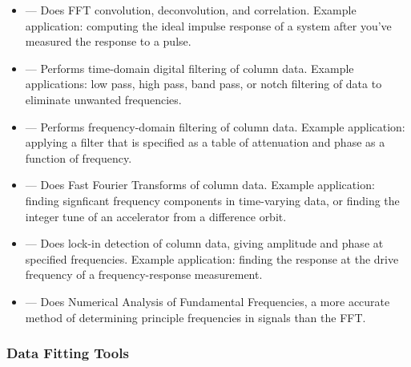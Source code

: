 \documentclass[11pt]{article}
\begin{document}
\begin{itemize}

\item {} --- Does FFT convolution, deconvolution, and correlation. Example
application: computing the ideal impulse response of a system after you've measured the response to
a pulse.

\item {} --- Performs time-domain digital filtering of column data.  Example applications:
low pass, high pass, band pass, or notch filtering of data to eliminate unwanted frequencies.

\item {} --- Performs frequency-domain filtering of column data.  Example application:
applying a filter that is specified as a table of attenuation and phase as a function of frequency.

\item {} --- Does Fast Fourier Transforms of column data.  Example application: finding signficant
frequency components in time-varying data, or finding the integer tune of an accelerator from a difference orbit.

\item {} --- Does lock-in detection of column data, giving amplitude and phase at specified
frequencies.  Example application: finding the response at the drive frequency of a frequency-response measurement.

\item {} --- Does Numerical Analysis of Fundamental Frequencies, a more accurate
method of determining principle frequencies in signals than the FFT.

\end{itemize}

\subsubsection{Data Fitting Tools}
\end{document}
